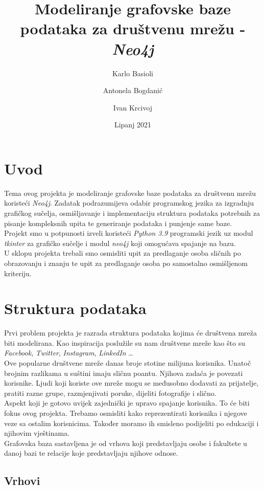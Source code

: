 \documentclass[titlepage, 12pt]{scrartcl}
\title{Modeliranje grafovske baze podataka za društvenu mrežu - \emph{Neo4j}}
\author{Karlo Basioli \and 
        Antonela Bogdanić \and 
        Ivan Krcivoj }
\date{Lipanj 2021}
\begin{document}
\maketitle

\tableofcontents

\newpage

\section{Uvod}
Tema ovog projekta je modeliranje grafovske baze podataka za društvenu mrežu koristeći \emph{Neo4j}. Zadatak podrazumijeva odabir programskog jezika za izgradnju grafičkog sučelja, osmišljavanje i implementaciju struktura podataka potrebnih za pisanje kompleksnih upita te generiranje podataka i punjenje same baze. \\
Projekt smo u potpunosti izveli koristeći \emph{Python 3.9} programski jezik uz modul \emph{tkinter} za grafičko sučelje i modul \emph{neo4j} koji omogućava spajanje na bazu. \\
U sklopu projekta trebali smo osmisliti upit za predlaganje osoba sličnih po obrazovanju i znanju te upit za predlaganje osoba po samostalno osmišljenom kriteriju.

\newpage
\section{Struktura podataka}
Prvi problem projekta je razrada struktura podataka kojima će društvena mreža biti modelirana. Kao inspiracija poslužile su nam društvene mreže kao što su \emph{Facebook}, \emph{Twitter}, \emph{Instagram}, \emph{LinkedIn} \dots \\
Ove popularne društvene mreže danas broje stotine milijuna korisnika. Unatoč brojnim razlikama u suštini imaju sličnu poantu. Njihova zadaća je povezati korisnike. Ljudi koji koriste ove mreže mogu se međusobno dodavati za prijatelje, pratiti razne grupe, razmjenjivati poruke, dijeliti fotografije i slično. \\
Aspekt koji je gotovo uvijek zajednički je upravo spajanje korisnika. To će biti fokus ovog projekta. Trebamo osmisliti kako reprezentirati korisnika i njegove veze sa ostalim korisnicima. Također moramo ih smisleno podijeliti po edukaciji i njihovim vještinama. \\
Grafovska baza sastavljena je od vrhova koji predstavljaju osobe i fakultete u danoj bazi te relacije koje predstavljaju njihove odnose.

\subsection{Vrhovi}
\end{document}
